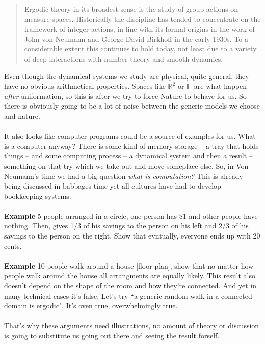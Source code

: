 \documentclass[12pt]{article}
\begin{document}
\begin{quotation}
Ergodic theory in its broadest sense is the study of group actions on measure spaces.
Historically the discipline has tended to concentrate on the framework of integer
actions, in line with its formal origins in the work of John von Neumann and
George David Birkhoff in the early 1930s. To a considerable extent this continues
to hold today, not least due to a variety of deep interactions with number theory and
smooth dynamics. \end{quotation}
Even though the dynamical systems we study are physical, quite general, they have no obvious arithmetical properties.  Spaces like $\mathbb{R}^2$ or $\mathbb{H}$ are what happen \textit{after} uniformation, so this is after we try to force Nature to behave for us.  So there is obviously going to be a lot of noise between the generic models we choose and nature.  \\ \\
It also looks like computer programs could be a source of examples for us.  What is a computer anyway?  There is some kind of memory storage -- a tray that holds things -- and some computing process -- a dynamical system and then a result -- something on that try which we take out and move someplace else.  So, in Von Neumann's time we had a big question \textit{what is computation?} This is already being discussed in babbages time yet all cultures have had to develop bookkeeping systems. \\ \\
\textbf{Example} 5 people arranged in a circle, one person has \$1 and other people have nothing.  Then, gives 1/3 of his savings to the person on his left and 2/3 of his savings to the person on the right.  Show that evntually, everyone ends up with 20 cents. \\ \\
\textbf{Example} 10 people walk around a house [floor plan], show that no matter how people walk around the house all arrangments are equally likely.  This result also doesn't depend on the shape of the room and how they're connected.  And yet in many technical cases it's false.  Let's try ``a generic random walk in a connected domain is ergodic".  It's oven true, overwhelmingly true.  \\ \\
That's why these arguments need illustrations, no amount of theory or discussion is going to substitute us going out there and seeing the result forself. \\ \\
\end{document}
